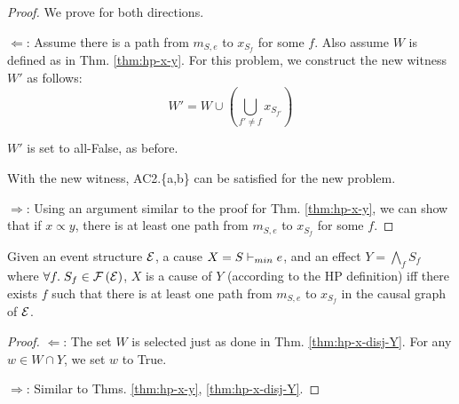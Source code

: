 \begin{proof}
We prove for both directions.

$\Leftarrow$: Assume there is a path from $m_{S,e}$ to $x_{S_f}$ for some $f$.
Also assume $W$ is defined as in Thm. \ref{thm:hp-x-y}. For this problem,
we construct the new witness $W'$ as follows:
\[ W' = W \cup \left( \bigcup_{f' \neq f} x_{S_{f'}} \right) \]

$W'$ is set to all-False, as before.

With the new witness, AC2.\{a,b\} can be satisfied
for the new problem.

$\Rightarrow$: Using an argument similar to the proof for Thm. \ref{thm:hp-x-y},
we can show that if $x \propto y$, there is at least one path from $m_{S,e}$ to $x_{S_f}$ for some $f$.
\end{proof}

\begin{thm}\label{thm:hp-x-conj-Y}
Given an event structure $\mathcal{E}$, a cause $X = S \vdash_{min} e$,
and an effect $Y = \bigwedge_{f} S_{f}$ where $\forall f.\;S_f \in \mathcal{F} \left( \mathcal{E} \right)$,
$X$ is a cause of $Y$ (according to the HP definition)
iff there exists $f$ such that there is at least one path from $m_{S,e}$ to $x_{S_f}$
in the causal graph of $\mathcal{E}$.
\end{thm}

\begin{proof}
$\Leftarrow$: The set $W$ is selected just as done in Thm. \ref{thm:hp-x-disj-Y}.
For any $w \in W \cap Y$, we set $w$ to True.

$\Rightarrow$: Similar to Thms. \ref{thm:hp-x-y}, \ref{thm:hp-x-disj-Y}.
\end{proof}





